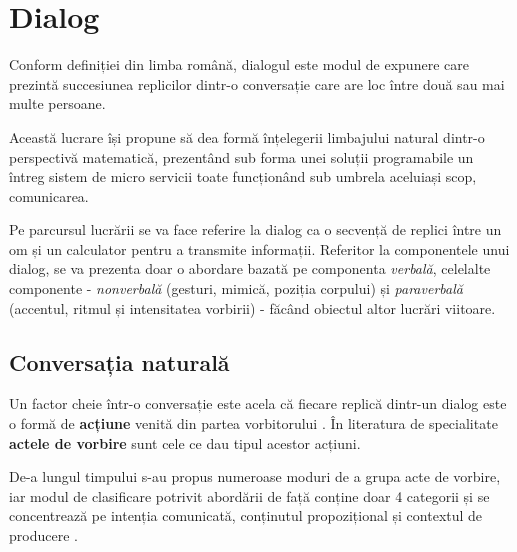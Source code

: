 \chapter{Dialog}

Conform definiției din limba română, dialogul este modul de expunere care prezintă succesiunea replicilor dintr-o conversație care are loc între două sau mai multe persoane.

Această lucrare își propune să dea formă înțelegerii limbajului natural dintr-o perspectivă matematică, prezentând sub forma unei soluții programabile un întreg sistem de micro servicii toate funcționând sub umbrela aceluiași scop, comunicarea.

Pe parcursul lucrării se va face referire la dialog ca o secvență de replici între un om și un calculator pentru a transmite informații.
Referitor la componentele unui dialog, se va prezenta doar o abordare bazată pe componenta \textit{verbală}, celelalte componente - \textit{nonverbală} (gesturi, mimică, poziția corpului) și \textit{paraverbală} (accentul, ritmul și intensitatea vorbirii) - făcând obiectul altor lucrări viitoare.


\section{Conversația naturală}

Un factor cheie într-o conversație este acela că fiecare replică dintr-un dialog este o formă de \textbf{acțiune} venită din partea vorbitorului \cite{witt1953}. În literatura de specialitate \textbf{actele de vorbire} sunt cele ce dau tipul acestor acțiuni.

De-a lungul timpului s-au propus numeroase moduri de a grupa acte de vorbire, iar modul de clasificare potrivit abordării de față conține doar 4 categorii și se concentrează pe intenția comunicată, conținutul propozițional și contextul de producere \cite{acte-dialog}.


